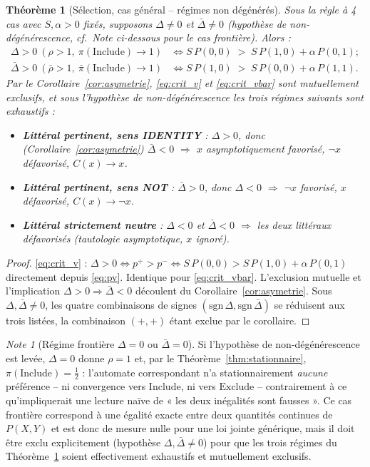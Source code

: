 \documentclass[12pt,a4paper]{article}
\newtheorem{theorem}{Théorème}[section]
\theoremstyle{remark}
\newtheorem{note}{Note}[section]
\newcommand{\Inc}{\ensuremath{\mathrm{Include}}}
\newcommand{\Exc}{\ensuremath{\mathrm{Exclude}}}
\begin{document}
\begin{theorem}[Sélection, cas général -- régimes non dégénérés]\label{thm:selection}
Sous la règle à 4 cas avec $S,\alpha>0$ fixés, supposons $\Delta\ne0$ et
$\bar\Delta\ne0$ (hypothèse de non-dégénérescence, cf.\ Note ci-dessous pour le
cas frontière). Alors :
\begin{align}
  \Delta>0\ (\rho>1,\ \pi(\Inc)\to1) &\iff S\,P(0,0) \;>\; S\,P(1,0)+\alpha\,P(0,1); \label{eq:crit_v}\\
  \bar\Delta>0\ (\bar\rho>1,\ \bar\pi(\Inc)\to1) &\iff S\,P(1,0) \;>\; S\,P(0,0)+\alpha\,P(1,1). \label{eq:crit_vbar}
\end{align}
Par le Corollaire~\ref{cor:asymetrie}, \eqref{eq:crit_v} et \eqref{eq:crit_vbar}
sont mutuellement exclusifs, et sous l'hypothèse de non-dégénérescence les
trois régimes suivants sont exhaustifs :
\begin{itemize}
  \item \textbf{Littéral pertinent, sens IDENTITY} : $\Delta>0$, donc
  (Corollaire~\ref{cor:asymetrie}) $\bar\Delta<0$ $\Rightarrow$ $x$
  asymptotiquement favorisé, $\neg x$ défavorisé, $C(x)\to x$.
  \item \textbf{Littéral pertinent, sens NOT} : $\bar\Delta>0$, donc $\Delta<0$
  $\Rightarrow$ $\neg x$ favorisé, $x$ défavorisé, $C(x)\to\neg x$.
  \item \textbf{Littéral strictement neutre} : $\Delta<0$ \emph{et}
  $\bar\Delta<0$ $\Rightarrow$ les deux littéraux défavorisés (tautologie
  asymptotique, $x$ ignoré).
\end{itemize}
\end{theorem}

\begin{proof}
\eqref{eq:crit_v} : $\Delta>0 \iff p^+>p^- \iff S\,P(0,0) > S\,P(1,0)+\alpha\,P(0,1)$
directement depuis \eqref{eq:pv}. Identique pour \eqref{eq:crit_vbar}.
L'exclusion mutuelle et l'implication $\Delta>0\Rightarrow\bar\Delta<0$
découlent du Corollaire~\ref{cor:asymetrie}. Sous $\Delta,\bar\Delta\ne0$, les
quatre combinaisons de signes $(\mathrm{sgn}\,\Delta,\mathrm{sgn}\,\bar\Delta)$
se réduisent aux trois listées, la combinaison $(+,+)$ étant exclue par le
corollaire.
\end{proof}

\begin{note}[Régime frontière $\Delta=0$ ou $\bar\Delta=0$]
Si l'hypothèse de non-dégénérescence est levée, $\Delta=0$ donne $\rho=1$ et,
par le Théorème~\ref{thm:stationnaire}, $\pi(\Inc)=\tfrac12$ : l'automate
correspondant n'a stationnairement \emph{aucune} préférence -- ni convergence
vers $\Inc$, ni vers $\Exc$ -- contrairement à ce qu'impliquerait une lecture
naïve de « les deux inégalités sont fausses ». Ce cas frontière correspond à
une égalité exacte entre deux quantités continues de $P(X,Y)$ et est donc de
mesure nulle pour une loi jointe générique, mais il doit être exclu
explicitement (hypothèse $\Delta,\bar\Delta\ne0$) pour que les trois régimes du
Théorème~\ref{thm:selection} soient effectivement exhaustifs et mutuellement
exclusifs.
\end{note}
\end{document}
